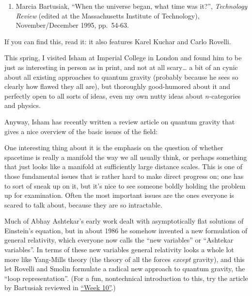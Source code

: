 \documentclass{article}
\def\tightlist{}
\renewcommand{\texttt}[1]{%
  \begingroup
  \ttfamily
  \begingroup\lccode`~=`/\lowercase{\endgroup\def~}{/\discretionary{}{}{}}%
  \begingroup\lccode`~=`[\lowercase{\endgroup\def~}{[\discretionary{}{}{}}%
  \begingroup\lccode`~=`.\lowercase{\endgroup\def~}{.\discretionary{}{}{}}%
  \catcode`/=\active\catcode`[=\active\catcode`.=\active
  \scantokens{#1\noexpand}%
  \endgroup
}
\begin{document}
\begin{enumerate}
\def\labelenumi{\arabic{enumi})}
\tightlist
\item
  Marcia Bartusiak, ``When the universe began, what time was it?'',
  \emph{Technology Review} (edited at the Massachusetts Institute of
  Technology), November/December 1995, pp.~54-63.
\end{enumerate}

If you can find this, read it: it also features Karel Kuchar and Carlo
Rovelli.

This spring, I visited Isham at Imperial College in London and found him
to be just as interesting in person as in print, and not at all
scary\ldots{} a bit of an cynic about all existing approaches to quantum
gravity (probably because he sees so clearly how flawed they all are),
but thoroughly good-humored about it and perfectly open to all sorts of
ideas, even my own nutty ideas about \(n\)-categories and physics.

Anyway, Isham has recently written a review article on quantum gravity
that gives a nice overview of the basic issues of the field:


One interesting thing about it is the emphasis on the question of
whether spacetime is really a manifold the way we all usually think, or
perhaps something that just looks like a manifold at sufficiently large
distance scales. This is one of those fundamental issues that is rather
hard to make direct progress on; one has to sort of sneak up on it, but
it's nice to see someone boldly holding the problem up for examination.
Often the most important issues are the ones everyone is scared to talk
about, because they are so intractable.

Much of Abhay Ashtekar's early work dealt with asymptotically flat
solutions of Einstein's equation, but in about 1986 he somehow invented
a new formulation of general relativity, which everyone now calls the
``new variables'' or ``Ashtekar variables''. In terms of these new
variables general relativity looks a whole lot more like Yang-Mills
theory (the theory of all the forces \emph{except} gravity), and this
let Rovelli and Smolin formulate a radical new approach to quantum
gravity, the ``loop representation''. (For a fun, nontechnical
introduction to this, try the article by Bartusiak reviewed in
\protect\hyperlink{week10}{``Week 10''}.)
\end{document}
